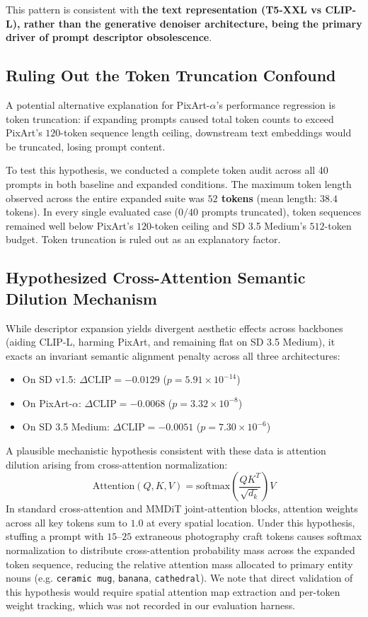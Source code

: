 \documentclass[10pt,twocolumn,letterpaper]{article}
\begin{document}
This pattern is consistent with \textbf{the text representation (T5-XXL vs CLIP-L), rather than the generative denoiser architecture, being the primary driver of prompt descriptor obsolescence}.

\subsection{Ruling Out the Token Truncation Confound}
A potential alternative explanation for PixArt-$\alpha$'s performance regression is token truncation: if expanding prompts caused total token counts to exceed PixArt's $120$-token sequence length ceiling, downstream text embeddings would be truncated, losing prompt content.

To test this hypothesis, we conducted a complete token audit across all 40 prompts in both baseline and expanded conditions. The maximum token length observed across the entire expanded suite was \textbf{$52$ tokens} (mean length: $38.4$ tokens). In every single evaluated case ($0 / 40$ prompts truncated), token sequences remained well below PixArt's $120$-token ceiling and SD 3.5 Medium's $512$-token budget. Token truncation is ruled out as an explanatory factor.

\subsection{Hypothesized Cross-Attention Semantic Dilution Mechanism}
While descriptor expansion yields divergent aesthetic effects across backbones (aiding CLIP-L, harming PixArt, and remaining flat on SD 3.5 Medium), it exacts an invariant semantic alignment penalty across all three architectures:
\begin{itemize}
    \item On SD v1.5: $\Delta\text{CLIP} = -0.0129$ ($p = 5.91 \times 10^{-14}$)
    \item On PixArt-$\alpha$: $\Delta\text{CLIP} = -0.0068$ ($p = 3.32 \times 10^{-8}$)
    \item On SD 3.5 Medium: $\Delta\text{CLIP} = -0.0051$ ($p = 7.30 \times 10^{-6}$)
\end{itemize}

A plausible mechanistic hypothesis consistent with these data is attention dilution arising from cross-attention normalization:
$$\text{Attention}(Q, K, V) = \text{softmax}\left(\frac{Q K^T}{\sqrt{d_k}}\right) V$$
In standard cross-attention and MMDiT joint-attention blocks, attention weights across all key tokens sum to $1.0$ at every spatial location. Under this hypothesis, stuffing a prompt with $15\text{--}25$ extraneous photography craft tokens causes softmax normalization to distribute cross-attention probability mass across the expanded token sequence, reducing the relative attention mass allocated to primary entity nouns (e.g. \texttt{ceramic mug}, \texttt{banana}, \texttt{cathedral}). We note that direct validation of this hypothesis would require spatial attention map extraction and per-token weight tracking, which was not recorded in our evaluation harness.
\end{document}
